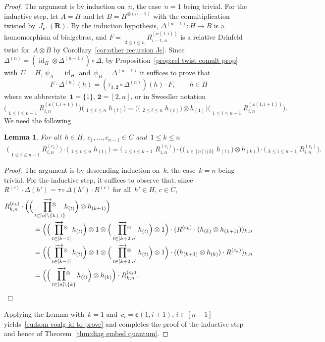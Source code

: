 \documentclass[12pt, reqno]{amsart}
\newtheorem{lemma}[theorem]{Lemma}
\theoremstyle{definition}
\newcommand{\ascprod}{\mathop{\overrightarrow{\prod}}}
\newcommand{\ascprodtens}{\mathop{\overrightarrow{\prod}^\tensor}}
\numberwithin{equation}{section}
\newcommand{\tensor}{\otimes}
\DeclareMathOperator{\id}{id}
\begin{document}
\begin{proof}
The argument is by induction on~$n$, the case~$n=1$ being
trivial. For the inductive step, let 
$A=H$ and let $B=H^{\tensor (n-1)}$ with the 
comultiplication twisted by~$J_{\mathbf c^+}(\mathbf R)$.
By the induction hypothesis, $\Delta^{(n-1)}:H\to B$
is a homomorphism of bialgebras, and  
$F=\ascprod\limits_{2\le i\le n} R_{i-1,n}^{(\mathbf c(1,i))}$ is a relative Drinfeld twist for~$A\tensor B$
by Corollary~\ref{cor:other recursion Jc}.
Since~$\Delta^{(n)}=(\id_H\tensor\Delta^{(n-1)})\circ\Delta$, 
by Proposition~\ref{prop:rel twist comult prop}
with~$U=H$, $\psi_A=\id_H$ and~$\psi_B=\Delta^{(n-1)}$
it suffices to prove that  
$$
F\cdot\Delta^{(n)}(h)=(\tau_{\mathbf 1,\mathbf 2}\circ\Delta^{(n)})(h)\cdot F,\qquad h\in H
$$
where we abbreviate~$\mathbf 1=\{1\}$, $\mathbf 2=[2,n]$, or in Sweedler notation
\begin{equation}\label{eq:hom coalg id to prove}
\Big(\ascprod\limits_{1\le i\le n-1} R_{i,n}^{(\mathbf c(1,i+1))}\Big)
\Big(\ascprodtens_{1\le t\le n} h_{(t)}\Big)=
\Big(\Big(\ascprodtens_{2\le t\le n}h_{(t)}\Big)\tensor h_{(1)}\Big)\Big(
\ascprod\limits_{1\le i\le n-1} R_{i,n}^{(\mathbf c(1,i+1))}\Big).
\end{equation}
We need the following
\begin{lemma}\label{lem:hom bialg intern}
For all~$h\in H$, $c_1,\dots,c_{n-1}\in C$
and~$1\le k\le n$
\begin{align*}
\Big(\ascprod\limits_{1\le i\le n-1} R_{i,n}^{(c_i)}\Big)
\cdot\Big(\ascprodtens_{1\le t\le n} h_{(t)}\Big)
=\Big(\ascprod_{1\le i\le k-1} R_{i,n}^{(c_i)}
\Big)\cdot\Big(\Big(\ascprodtens_{t\in [n]\setminus\{k\}}\!\! h_{(t)}\Big)\tensor h_{(k)}\Big)
\cdot\Big(\ascprod_{k\le i\le n-1}\!\! R_{i,n}^{(c_i)}\Big).
\end{align*}
\end{lemma}
\begin{proof}
The argument is by descending induction on~$k$, the case~$k=n$ being trivial. For the inductive step,
it suffices to observe that, since~$R^{(c)}\cdot \Delta(h')=
\tau\circ \Delta(h')\cdot R^{(c)}$ for all~$h'\in H$, $c\in C$,
\begin{align*}
R_{k,n}^{(c_k)}\cdot\Big(\Big(&\ascprodtens_{t\in [n]\setminus\{k+1\}}\!\! h_{(t)}\Big)\tensor h_{(k+1)}\Big)\\
&=
\Big(\Big(\ascprodtens_{t\in[k-1]} h_{(t)}\Big)\tensor 1
\tensor \Big(\ascprodtens_{t\in[k+2,n]} h_{(t)}\Big)\tensor 1\Big)
\cdot (R^{(c_k)}\cdot (h_{(k)}\tensor h_{(k+1)}))_{k,n}\\
&=
\Big(\Big(\ascprodtens_{t\in[k-1]} h_{(t)}\Big)\tensor 1
\tensor \Big(\ascprodtens_{t\in[k+2,n]} h_{(t)}\Big)\tensor 1\Big)
\cdot ((h_{(k+1)}\tensor h_{(k)})\cdot R^{(c_k)})_{k,n}\\
&=\Big(\Big(\ascprodtens_{t\in[n]\setminus\{k\}}
h_{(t)}\Big)\tensor h_{(k)}\Big)\cdot R_{k,n}^{(c_k)}.
\qedhere
\end{align*}
\end{proof}
Applying the Lemma with~$k=1$ and~$c_i=\mathbf c(1,i+1)$, $i\in[n-1]$
yields~\eqref{eq:hom coalg id to prove} and completes the 
proof of the inductive step and hence of Theorem~\ref{thm:diag embed quantum}.
\end{proof}
\end{document}
